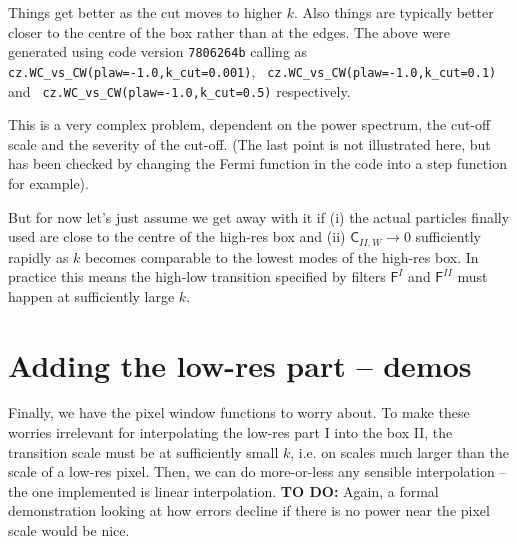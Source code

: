 \documentclass[11pt,a4paper,preprint]{aastex}
\begin{document}
Things get better as the cut moves to higher $k$. Also things are
typically better closer to the centre of the box rather than at the
edges.  The above were generated using code version {\tt 7806264b}
calling as {\tt cz.WC\_vs\_CW(plaw=-1.0,k\_cut=0.001)}, {\tt
  cz.WC\_vs\_CW(plaw=-1.0,k\_cut=0.1)} and {\tt
  cz.WC\_vs\_CW(plaw=-1.0,k\_cut=0.5)} respectively.

This is a very complex problem, dependent on the power spectrum, the
cut-off scale and the severity of the cut-off. (The last point is not
illustrated here, but has been checked by changing the Fermi function
in the code into a step function for example).

But for now let's just assume we get
away with it if (i) the actual particles finally used are close to the
centre of the high-res box and (ii) $\mathsf{C}_{II,W} \to 0$
sufficiently rapidly as $k$ becomes comparable to the lowest modes of
the high-res box. In practice this means the high-low transition
specified by filters $\mathsf{F}^I$ and $\mathsf{F}^{II}$ must happen
at sufficiently large $k$.



\section{Adding the low-res part -- demos}

Finally, we have the pixel window functions to worry about. To make
these worries irrelevant for interpolating the low-res part I into the
box II, the transition scale must be at sufficiently small $k$,
i.e. on scales much larger than the scale of a low-res pixel.  Then,
we can do more-or-less any sensible interpolation -- the one
implemented is linear interpolation. {\bf TO DO: } Again, a formal
demonstration looking at how errors decline if there is no power near
the pixel scale would be nice.
\end{document}
